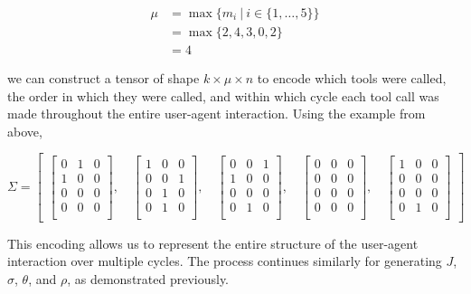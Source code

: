 \documentclass{article}
\begin{document}
\begin{align*}
\mu & = \max\{m_i \ | \ i \in \{1, \dots, 5\}\} \\
& = \max\{2, 4, 3, 0, 2\} \\
& = 4
\end{align*}


we can construct a tensor of shape $k \times \mu \times n$ to encode which tools were called, the order in which they were called, and within which cycle each tool call was made throughout the entire user-agent interaction. Using the example from above,

\[
\Sigma =
\begin{bmatrix}
\begin{bmatrix}
0 & 1 & 0 \\
1 & 0 & 0 \\
0 & 0 & 0 \\
0 & 0 & 0 \\
\end{bmatrix}, \quad
\begin{bmatrix}
1 & 0 & 0 \\
0 & 0 & 1 \\
0 & 1 & 0 \\
0 & 1 & 0 \\
\end{bmatrix}, \quad
\begin{bmatrix}
0 & 0 & 1 \\
1 & 0 & 0 \\
0 & 0 & 0 \\
0 & 1 & 0 \\
\end{bmatrix}, \quad
\begin{bmatrix}
0 & 0 & 0 \\
0 & 0 & 0 \\
0 & 0 & 0 \\
0 & 0 & 0 \\
\end{bmatrix}, \quad
\begin{bmatrix}
1 & 0 & 0 \\
0 & 0 & 0 \\
0 & 0 & 0 \\
0 & 1 & 0 \\
\end{bmatrix}
\end{bmatrix}
\]

This encoding allows us to represent the entire structure of the user-agent interaction over multiple cycles. The process continues similarly for generating $J$, $\sigma$, $\theta$, and $\rho$, as demonstrated previously.
\end{document}
